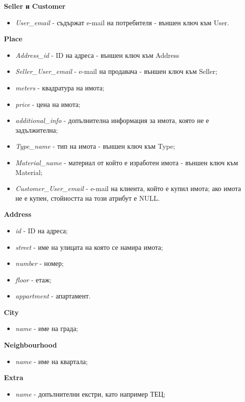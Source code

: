 \documentclass[a4paper,12pt, leqno]{article}
\begin{document}
\textbf{Seller и Customer}
\begin{itemize}
 \item \textit{User\_email} - съдържат e-mail на потребителя - външен ключ към User.
\end{itemize}

\textbf{Place}
\begin{itemize}
 \item \textit{Address\_id} - ID на адреса - външен ключ към Address
 \item \textit{Seller\_User\_email} - e-mail на продавача - външен ключ към Seller;
 \item \textit{meters} - квадратура на имота;
 \item \textit{price} - цена на имота;
 \item \textit{additional\_info} - допълнителна информация за имота, която не е задължителна;
 \item \textit{Type\_name} - тип на имота - външен ключ към Type;
 \item \textit{Material\_name} - материал от който е изработен имота - външен ключ към Material;
 \item \textit{Customer\_User\_email} - e-mail на клиента, който е купил имота; ако имота не е купен, стойността на този 
атрибут е NULL.
\end{itemize}

\textbf{Address}
\begin{itemize}
 \item \textit{id} - ID на адреса;
 \item \textit{street} - име на улицата на която се намира имота;
 \item \textit{number} - номер;
 \item \textit{floor} - етаж;
 \item \textit{appartment} - апартамент.
\end{itemize}

\textbf{City}
\begin{itemize}
 \item \textit{name} - име на града;
\end{itemize}

\textbf{Neighbourhood}
\begin{itemize}
 \item \textit{name} - име на квартала;
\end{itemize}

\textbf{Extra}
\begin{itemize}
 \item \textit{name} - допълнителни екстри, като например ТЕЦ;
\end{itemize}
\end{document}
